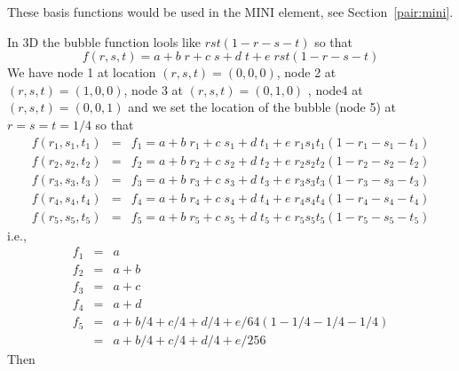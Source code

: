 These basis functions would be used in the MINI element, see Section~\ref{pair:mini}.

In 3D the bubble function lools like $rst(1-r-s-t)$ so that 
\[
f(r,s,t)=a+b\; r+c\; s+d\; t+e \; rst(1-r-s-t)
\]
We have node 1 at location $(r,s,t)=(0,0,0)$, node 2 at $(r,s,t)=(1,0,0)$, node 3 at $(r,s,t)=(0,1,0)$ , 
node4 at $(r,s,t)=(0,0,1)$ and we 
set the location of the bubble (node 5) at $r=s=t=1/4$ so that 
\begin{eqnarray}
f(r_1,s_1,t_1)&=&f_1 = a+b\; r_1+c\; s_1+d\; t_1+e\; r_1s_1t_1(1-r_1-s_1-t_1) \\
f(r_2,s_2,t_2)&=&f_2 = a+b\; r_2+c\; s_2+d\; t_2+e\; r_2s_2t_2(1-r_2-s_2-t_2) \\
f(r_3,s_3,t_3)&=&f_3 = a+b\; r_3+c\; s_3+d\; t_3+e\; r_3s_3t_3(1-r_3-s_3-t_3) \\
f(r_4,s_4,t_4)&=&f_4 = a+b\; r_4+c\; s_4+d\; t_4+e\; r_4s_4t_4(1-r_4-s_4-t_4) \\ 
f(r_5,s_5,t_5)&=&f_5 = a+b\; r_5+c\; s_5+d\; t_5+e\; r_5s_5t_5(1-r_5-s_5-t_5) 
\end{eqnarray}
i.e.,
\begin{eqnarray}
f_1 &=& a\\
f_2 &=& a+b\\
f_3 &=& a+c\\
f_4 &=& a+d\\
f_5 &=& a+b/4+c/4+d/4+e/64 (1-1/4-1/4-1/4) \\ 
    &=& a+b/4+c/4+d/4+e/256  
\end{eqnarray}
Then 

